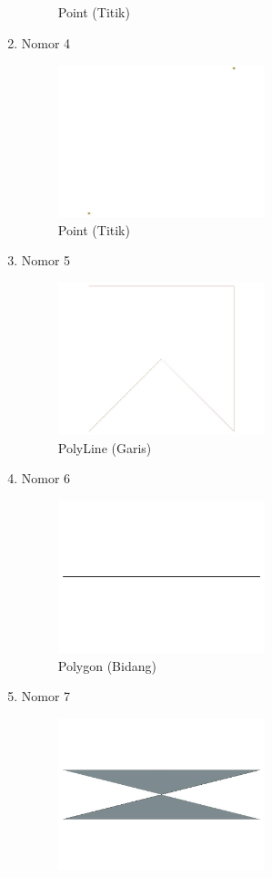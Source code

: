 \begin{enumerate}
\begin{figure}[H]
		\centering
		\caption{Point (Titik)}
	\end{figure}
	\item Nomor 4
	
	\begin{figure}[H]
		\includegraphics[width=6cm]{figures/Tugas2/1174066/No4.jpeg}
		\centering
		\caption{Point (Titik)}
	\end{figure}
	\item Nomor 5
	
	\begin{figure}[H]
		\includegraphics[width=6cm]{figures/Tugas2/1174066/No5.jpeg}
		\centering
		\caption{PolyLine (Garis)}
	\end{figure}
	\item Nomor 6
	
	\begin{figure}[H]
		\includegraphics[width=6cm]{figures/Tugas2/1174066/No6.jpeg}
		\centering
		\caption{Polygon (Bidang)}
	\end{figure}
	\item Nomor 7
	
	\begin{figure}[H]
		\includegraphics[width=6cm]{figures/Tugas2/1174066/No7.jpeg}

\end{figure}
\end{enumerate}
